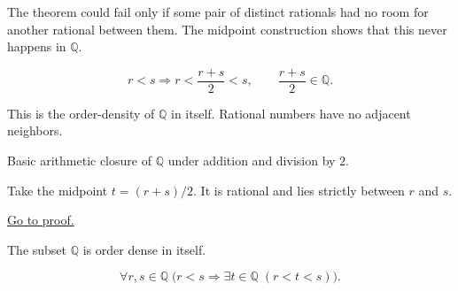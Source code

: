 \begin{remark*}
The theorem could fail only if some pair of distinct rationals had no room for
another rational between them. The midpoint construction shows that this never
happens in $\mathbb{Q}$.
\end{remark*}

\begin{remark*}
\[
r<s
\Longrightarrow
r<\frac{r+s}{2}<s,
\qquad
\frac{r+s}{2}\in\mathbb{Q}.
\]
\end{remark*}

\begin{remark*}[Interpretation]
This is the order-density of $\mathbb{Q}$ in itself.  Rational numbers have no
adjacent neighbors.
\end{remark*}

\begin{remark*}[Dependencies]
Basic arithmetic closure of $\mathbb{Q}$ under addition and division by $2$.
\end{remark*}

\begin{remark*}
Take the midpoint $t=(r+s)/2$.  It is rational and lies strictly between $r$
and $s$.
\end{remark*}

\begin{remark*}[Proof]
\hyperref[prf:between-any-two-rationals-is-a-rational]{Go to proof.}
\end{remark*}

\begin{tcolorbox}[colback=thmbox, colframe=thmborder, arc=2pt,
  left=6pt, right=6pt, top=4pt, bottom=4pt,
  title={\small\textbf{Corollary ($\mathbb{Q}$ Is Dense in Itself)}},
  fonttitle=\small\bfseries]
\begin{corollary}
\label{cor:q-dense-in-itself}
The subset $\mathbb{Q}$ is order dense in itself.
\end{corollary}
\end{tcolorbox}

\begin{remark*}
\[
\forall r,s\in\mathbb{Q}\;
\bigl(r<s \Longrightarrow \exists t\in\mathbb{Q}\;(r<t<s)\bigr).
\]
\end{remark*}


